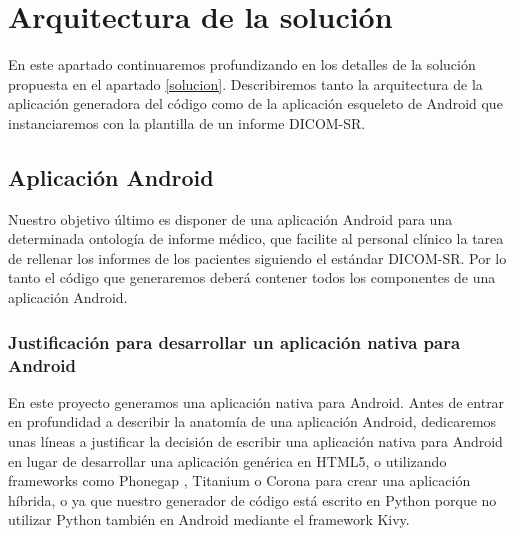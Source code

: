 
\section{Arquitectura de la solución}
En este apartado continuaremos profundizando en los detalles de la solución propuesta en el apartado \ref{solucion}. Describiremos tanto la arquitectura de la aplicación generadora del código como de la aplicación esqueleto de Android que instanciaremos con la plantilla de un informe DICOM-SR.\par

\subsection{Aplicación Android}
Nuestro objetivo último es disponer de una aplicación Android para una determinada ontología de informe médico,  que facilite al personal clínico la tarea de rellenar los informes de los pacientes siguiendo el estándar DICOM-SR. Por lo tanto el código que generaremos deberá contener todos los componentes de una aplicación Android.

\subsubsection{Justificación para desarrollar un aplicación nativa para Android}

En este proyecto generamos una aplicación nativa para Android. Antes de entrar en profundidad a describir la anatomía de una aplicación Android, dedicaremos unas líneas a justificar la decisión de escribir una aplicación nativa para Android en lugar de desarrollar una aplicación genérica en HTML5, o utilizando frameworks como Phonegap \cite{phonegap}, Titanium \cite{titanium} o Corona \cite{corona} para crear una aplicación híbrida, o ya que nuestro generador de código está escrito en Python porque no utilizar Python también en Android mediante el framework Kivy\cite{kivy}.\medskip\par

